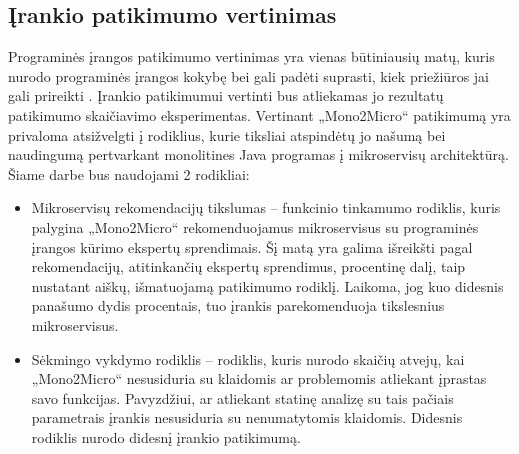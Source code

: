 \documentclass{VUMIFPSbakalaurinis}
\begin{document}
\subsection{Įrankio patikimumo vertinimas}
Programinės įrangos patikimumo vertinimas yra vienas būtiniausių matų, kuris nurodo programinės įrangos kokybę bei gali padėti suprasti, kiek priežiūros jai gali prireikti \cite{MarCY}. Įrankio patikimumui vertinti bus atliekamas jo rezultatų patikimumo skaičiavimo eksperimentas. Vertinant „Mono2Micro“ patikimumą yra privaloma atsižvelgti į rodiklius, kurie tiksliai atspindėtų jo našumą bei naudingumą pertvarkant monolitines Java programas į mikroservisų architektūrą. Šiame darbe bus naudojami 2 rodikliai:
\begin{itemize}
    \item Mikroservisų rekomendacijų tikslumas -- funkcinio tinkamumo rodiklis, kuris palygina „Mono2Micro“ rekomenduojamus mikroservisus su programinės įrangos kūrimo ekspertų sprendimais. Šį matą yra galima išreikšti pagal rekomendacijų, atitinkančių ekspertų sprendimus, procentinę dalį, taip nustatant aiškų, išmatuojamą patikimumo rodiklį. Laikoma, jog kuo didesnis panašumo dydis procentais, tuo įrankis parekomenduoja tikslesnius mikroservisus.

    \item Sėkmingo vykdymo rodiklis -- rodiklis, kuris nurodo skaičių atvejų, kai „Mono2Micro“ nesusiduria su klaidomis ar problemomis atliekant įprastas savo funkcijas. Pavyzdžiui, ar atliekant statinę analizę su tais pačiais parametrais įrankis nesusiduria su nenumatytomis klaidomis. Didesnis rodiklis nurodo didesnį įrankio patikimumą.
    \newline 
    



\end{itemize}
\end{document}
